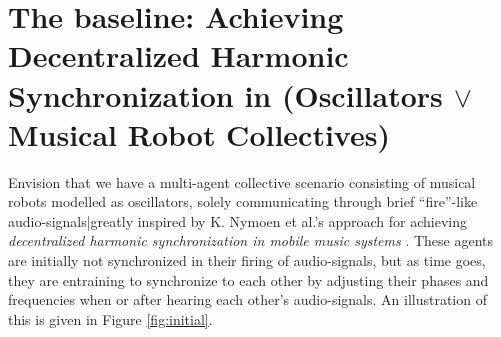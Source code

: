 \section{The baseline: Achieving Decentralized Harmonic Synchronization in (Oscillators $\vee$ Musical Robot Collectives)}
\label{sec:baseline}


	Envision that we have a multi-agent collective scenario consisting of musical robots modelled as oscillators, solely communicating through brief ``fire''-like audio-signals|greatly inspired by K. Nymoen et al.'s approach for achieving \textit{decentralized harmonic synchronization in mobile music systems} \cite{nymoen_synch}. These agents are initially not synchronized in their firing of audio-signals, but as time goes, they are entraining to synchronize to each other by adjusting their phases and frequencies when or after hearing each other's audio-signals. An illustration of this is given in Figure \ref{fig:initial}.

